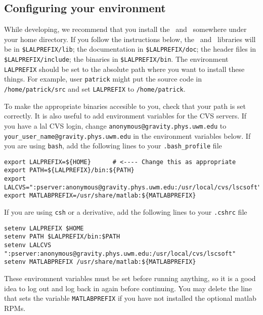\color{black}
\subsection{Configuring your environment}\label{ss:config}
\color{black}

While developing,  we recommend that you install the \lal\ and \lalapps\
somewhere under your home directory.  If you follow the
instructions below,  the \lal\ and \lalapps\ libraries will be in
\verb+$LALPREFIX/lib+;  the documentation in \verb+$LALPREFIX/doc+; the header
files in \verb+$LALPREFIX/include+; the binaries in \verb+$LALPREFIX/bin+.
The environment \verb+LALPREFIX+ should be set to the absolute path where you
want to install these things.  For example,  user \texttt{patrick} might put
the source code in \verb+/home/patrick/src+ and set \verb+LALPREFIX+ to
\verb+/home/patrick+.

To make the appropriate binaries accesible to you,  check that your path is
set correctly. It is also useful to add environment variables for the CVS
servers. If you have a lal CVS login, change
\verb+anonymous@gravity.phys.uwm.edu+ to
\verb+your_user_name@gravity.phys.uwm.edu+ in the environment variables below.
If you are using \texttt{bash}, add
the following lines to your \texttt{.bash\_profile} file
\begin{verbatim}
export LALPREFIX=${HOME}      # <---- Change this as appropriate
export PATH=${LALPREFIX}/bin:${PATH}
export LALCVS=":pserver:anonymous@gravity.phys.uwm.edu:/usr/local/cvs/lscsoft"
export MATLABPREFIX=/usr/share/matlab:${MATLABPREFIX}
\end{verbatim}
If you are using \texttt{csh} or a derivative,  add the following lines to
your \texttt{.cshrc} file
\begin{verbatim}
setenv LALPREFIX $HOME
setenv PATH $LALPREFIX/bin:$PATH
setenv LALCVS ":pserver:anonymous@gravity.phys.uwm.edu:/usr/local/cvs/lscsoft"
setenv MATLABPREFIX /usr/share/matlab:${MATLABPREFIX}
\end{verbatim}
These enviromnent variables must be set before running anything,
so it is a good idea to log out and log back in again before
continuing. You may delete the line that sets the variable 
\texttt{MATLABPREFIX} if you have not installed the optional matlab RPMs.

\color{black}
